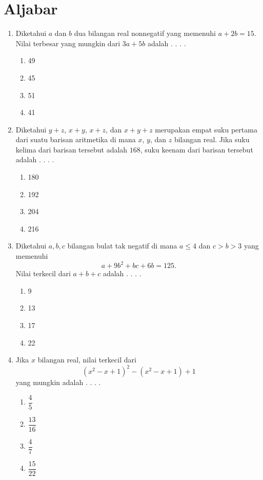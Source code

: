 \documentclass{article}
\begin{document}
\section*{Aljabar}
\begin{enumerate}[label={Soal \arabic*}]
    \item Diketahui $a$ dan $b$ dua bilangan real nonnegatif yang memenuhi $a+2b=15$. Nilai terbesar yang mungkin dari $3a+5b$ adalah . . . .
    \begin{enumerate}[label={(\Alph*)}]
        \item 49 \item 45 \item 51 \item 41
    \end{enumerate}


    \item Diketahui $y+z$, $x+y$, $x+z$, dan $x+y+z$ merupakan empat suku pertama dari suatu barisan aritmetika di mana $x$, $y$, dan $z$ bilangan real. Jika suku kelima dari barisan tersebut adalah $168$, suku keenam dari barisan tersebut adalah . . . .
    \begin{enumerate}[label={(\Alph*)}]
        \item 180 \item 192 \item 204 \item 216
    \end{enumerate}

    \item Diketahui $a,b,c$ bilangan bulat tak negatif di mana $a\le 4$ dan $c>b>3$ yang memenuhi
    $$a+9b^2  + bc+6b= 125.$$
    Nilai terkecil dari $a+b+c$ adalah . . . .
    \begin{enumerate}[label={(\Alph*)}]
        \item 9 \item 13 \item 17 \item 22
    \end{enumerate}

    \item Jika $x$ bilangan real, nilai terkecil dari
    $$\left (x^2-x+1\right )^2 -\left (x^2-x+1\right )+1$$
    yang mungkin adalah . . . .
    \begin{enumerate}[label={(\Alph*)}]
        \item $\dfrac{4}{5}$ \item $\dfrac{13}{16}$ \item $\dfrac{4}{7}$ \item $\dfrac{15}{22}$
    \end{enumerate}


\end{enumerate}
\end{document}
